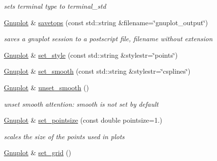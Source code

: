\begin{DoxyCompactItemize}
\begin{DoxyCompactList}\small\item\em sets terminal type to terminal\-\_\-std \end{DoxyCompactList}\item 
\hypertarget{classkukadu_1_1Gnuplot_ae6857197036b0739d792b5aa3833c673}{\hyperlink{classkukadu_1_1Gnuplot}{Gnuplot} \& \hyperlink{classkukadu_1_1Gnuplot_ae6857197036b0739d792b5aa3833c673}{savetops} (const std\-::string \&filename=\char`\"{}gnuplot\-\_\-output\char`\"{})}\label{classkukadu_1_1Gnuplot_ae6857197036b0739d792b5aa3833c673}

\begin{DoxyCompactList}\small\item\em saves a gnuplot session to a postscript file, filename without extension \end{DoxyCompactList}\item 
\hyperlink{classkukadu_1_1Gnuplot}{Gnuplot} \& \hyperlink{classkukadu_1_1Gnuplot_a168775b6cf04b25a621886d2f0f85806}{set\-\_\-style} (const std\-::string \&stylestr=\char`\"{}points\char`\"{})
\item 
\hyperlink{classkukadu_1_1Gnuplot}{Gnuplot} \& \hyperlink{classkukadu_1_1Gnuplot_a8b8849a77a1c674c30e4e5f8d59f8308}{set\-\_\-smooth} (const std\-::string \&stylestr=\char`\"{}csplines\char`\"{})
\item 
\hyperlink{classkukadu_1_1Gnuplot}{Gnuplot} \& \hyperlink{classkukadu_1_1Gnuplot_abbebd88fffd2654ff192d6222f4d8e65}{unset\-\_\-smooth} ()
\begin{DoxyCompactList}\small\item\em unset smooth attention\-: smooth is not set by default \end{DoxyCompactList}\item 
\hypertarget{classkukadu_1_1Gnuplot_ab1033881b0494423cd292c5084bf3925}{\hyperlink{classkukadu_1_1Gnuplot}{Gnuplot} \& \hyperlink{classkukadu_1_1Gnuplot_ab1033881b0494423cd292c5084bf3925}{set\-\_\-pointsize} (const double pointsize=1.)}\label{classkukadu_1_1Gnuplot_ab1033881b0494423cd292c5084bf3925}

\begin{DoxyCompactList}\small\item\em scales the size of the points used in plots \end{DoxyCompactList}\item 
\hypertarget{classkukadu_1_1Gnuplot_aebcefffa35cefd5e4e0cffab0f3b5a6a}{\hyperlink{classkukadu_1_1Gnuplot}{Gnuplot} \& \hyperlink{classkukadu_1_1Gnuplot_aebcefffa35cefd5e4e0cffab0f3b5a6a}{set\-\_\-grid} ()}\label{classkukadu_1_1Gnuplot_aebcefffa35cefd5e4e0cffab0f3b5a6a}


\end{DoxyCompactItemize}

